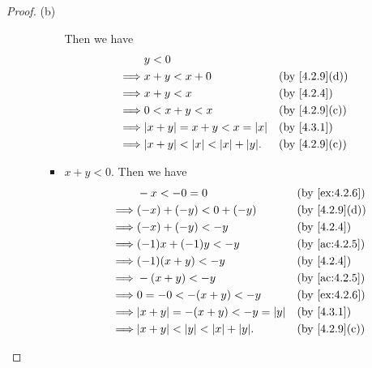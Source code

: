 \begin{proof}{(b)}
\begin{itemize}
\begin{itemize}
\begin{itemize}
                          Then we have
                          \begin{align*}
                                     & y < 0                                                                       \\
                            \implies & x + y < x + 0                              &  & \text{(by \cref{4.2.9}(d))} \\
                            \implies & x + y < x                                  &  & \by{4.2.4}                  \\
                            \implies & 0 < x + y < x                              &  & \text{(by \cref{4.2.9}(c))} \\
                            \implies & \abs{x + y} = x + y < x = \abs{x}          &  & \by{4.3.1}                  \\
                            \implies & \abs{x + y} < \abs{x} < \abs{x} + \abs{y}. &  & \text{(by \cref{4.2.9}(c))}
                          \end{align*}
                    \item \(x + y < 0\).
                          Then we have
                          \begin{align*}
                                     & -x < -0 = 0                                &  & \by{ex:4.2.6}               \\
                            \implies & (-x) + (-y) < 0 + (-y)                     &  & \text{(by \cref{4.2.9}(d))} \\
                            \implies & (-x) + (-y) < -y                           &  & \by{4.2.4}                  \\
                            \implies & (-1)x + (-1)y < -y                         &  & \by{ac:4.2.5}               \\
                            \implies & (-1)(x + y) < -y                           &  & \by{4.2.4}                  \\
                            \implies & -(x + y) < -y                              &  & \by{ac:4.2.5}               \\
                            \implies & 0 = -0 < -(x + y) < -y                     &  & \by{ex:4.2.6}               \\
                            \implies & \abs{x + y} = -(x + y) < -y = \abs{y}      &  & \by{4.3.1}                  \\
                            \implies & \abs{x + y} < \abs{y} < \abs{x} + \abs{y}. &  & \text{(by \cref{4.2.9}(c))}

\end{align*}
\end{itemize}
\end{itemize}
\end{itemize}
\end{proof}
